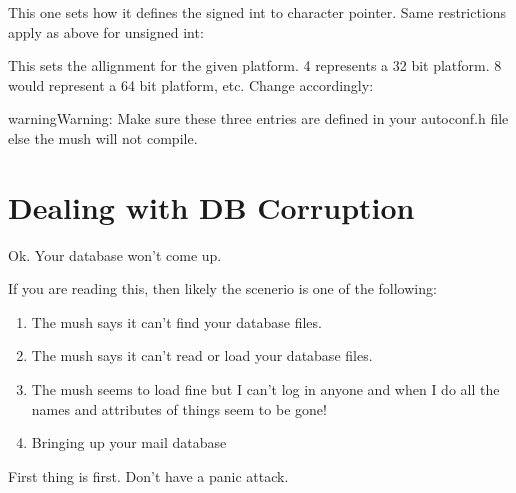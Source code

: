 \documentclass[letterpaper,10pt,english]{sphinxmanual}
\begin{document}
\sphinxAtStartPar
This one sets how it defines the signed int to character pointer.  Same
restrictions apply as above for unsigned int:

\begin{sphinxVerbatim}[commandchars=\\\{\}]
      
\end{sphinxVerbatim}

\sphinxAtStartPar
This sets the allignment for the given platform.  4 represents a 32 bit
platform.  8 would represent a 64 bit platform, etc.  Change accordingly:

\begin{sphinxVerbatim}[commandchars=\\\{\}]
\end{sphinxVerbatim}

\begin{sphinxadmonition}{warning}{Warning:}
\sphinxAtStartPar
Make sure these three entries are defined in your autoconf.h file else
the mush will not compile.
\end{sphinxadmonition}


\section{Dealing with DB Corruption}
\label{\detokenize{troubleshooting:dealing-with-db-corruption}}
\sphinxAtStartPar
Ok.  Your database won’t come up.

\sphinxAtStartPar
If you are reading this, then likely the scenerio is one of the following:
\begin{enumerate}
%
\item {} 
\sphinxAtStartPar
The mush says it can’t find your database files.

\item {} 
\sphinxAtStartPar
The mush says it can’t read or load your database files.

\item {} 
\sphinxAtStartPar
The mush seems to load fine but I can’t log in anyone and when I do
all the names and attributes of things seem to be gone!

\item {} 
\sphinxAtStartPar
Bringing up your mail database

\end{enumerate}

\sphinxAtStartPar
First thing is first.  Don’t have a panic attack.
\end{document}
